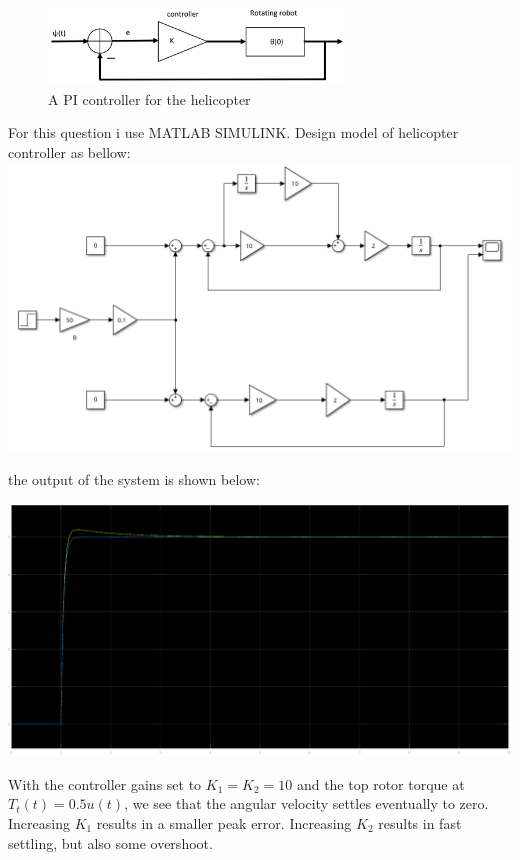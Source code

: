 \documentclass[12pt]{article}
\begin{document}
\begin{figure}[h]
	\centering
	\includegraphics[width=0.7\textwidth]{images/img2}
	\caption{A PI controller for the helicopter}
	\label{fig:A PI controller for the helicopter}
\end{figure}



\begin{qsolve}[Solution]
	For this question i use MATLAB SIMULINK. Design model of helicopter controller as bellow:\\
	
	\centering\includegraphics*[width=1\linewidth]{images/img5}
	
	
	\raggedright the output of the system is shown below:
	
	\centering\includegraphics*[width=1\linewidth]{images/Q7_result}
	
	
	\raggedright With the controller gains set to $K_1 = K_2 = 10$ and the top rotor torque at $T_t(t)=0.5u(t)$, we see that the angular velocity settles eventually to zero. Increasing $K_1$ results in a smaller peak error. Increasing $K_2$ results in fast settling, but also some overshoot.
	
	
\end{qsolve}
\vfil
\clearpage




\vspace*{\fill}
\begin{center}
	\makeendpage

\end{center}
\vfill %
\clearpage
\end{document}
